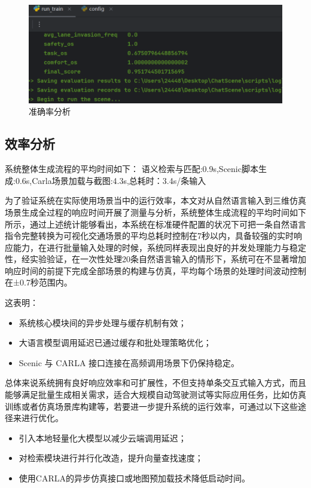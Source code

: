 \begin{figure}[h]
	\centering
	\includegraphics[width=1.0\textwidth]{"images/result1.pdf"}
	\caption{准确率分析}
	\label{fig:accuracy_analysis}
\end{figure}

\subsection{效率分析}
系统整体生成流程的平均时间如下：
语义检索与匹配:0.9s,Scenic脚本生成:0.6s,Carla场景加载与截图:4.3s,总耗时：3.4s/条输入


为了验证系统在实际使用场景当中的运行效率，本文对从自然语言输入到三维仿真场景生成全过程的响应时间开展了测量与分析，系统整体生成流程的平均时间如下所示，通过上述统计能够看出，本系统在标准硬件配置的状况下可把一条自然语言指令完整转换为可视化交通场景的平均总耗时控制在7秒以内，具备较强的实时响应能力，在进行批量输入处理的时候，系统同样表现出良好的并发处理能力与稳定性，经实验验证，在一次性处理20条自然语言输入的情形下，系统可在不显著增加响应时间的前提下完成全部场景的构建与仿真，平均每个场景的处理时间波动控制在±0.7秒范围内。

这表明：
\begin{itemize}
	\item 系统核心模块间的异步处理与缓存机制有效；
	\item 大语言模型调用延迟已通过缓存和批处理策略优化；
	\item Scenic 与 CARLA 接口连接在高频调用场景下仍保持稳定。
\end{itemize}

总体来说系统拥有良好响应效率和可扩展性，不但支持单条交互式输入方式，而且能够满足批量生成相关需求，适合大规模自动驾驶测试等实际应用任务，比如仿真训练或者仿真场景库构建等，若要进一步提升系统的运行效率，可通过以下这些途径来进行优化。
\begin{itemize}
	\item 引入本地轻量化大模型以减少云端调用延迟；
	\item 对检索模块进行并行化改造，提升向量查找速度；
	\item 使用CARLA的异步仿真接口或地图预加载技术降低启动时间。
\end{itemize}
